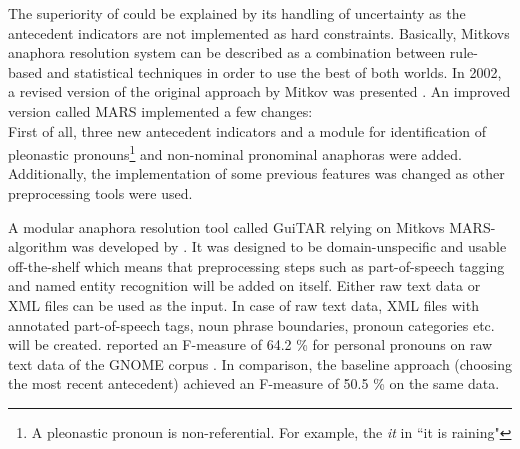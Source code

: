 The superiority of \citep{mitkov1998robust} could be explained by its handling of uncertainty as the antecedent indicators are not implemented as hard constraints. Basically, Mitkovs anaphora resolution system can be described as a combination between rule-based and statistical techniques in order to use the best of both worlds.
In 2002, a revised version of the original approach by Mitkov was presented \citep{mitkov2002new}. An improved version called MARS implemented a few changes:\\
First of all, three new antecedent indicators and a module for identification of pleonastic pronouns\footnote{A pleonastic pronoun is non-referential. For example, the \textit{it} in ``it is raining" } and non-nominal pronominal anaphoras were added. Additionally, the implementation of some previous features was changed as other preprocessing tools were used.

A modular anaphora resolution tool called GuiTAR relying on Mitkovs MARS-algorithm \citep{mitkov2002new} was developed by \cite{poesio2004general}. It was designed to be domain-unspecific and usable off-the-shelf which means that preprocessing steps such as part-of-speech tagging and named entity recognition will be added on itself. Either raw text data or XML files can be used as the input. In case of raw text data, XML files with annotated part-of-speech tags, noun phrase boundaries, pronoun categories etc. will be created. \citep{poesio2004mate} reported an F-measure of 64.2 \% for personal pronouns on raw text data of the GNOME corpus \citep{poesio2004general}. In comparison, the baseline approach (choosing the most recent antecedent) achieved an F-measure of 50.5 \% on the same data.

